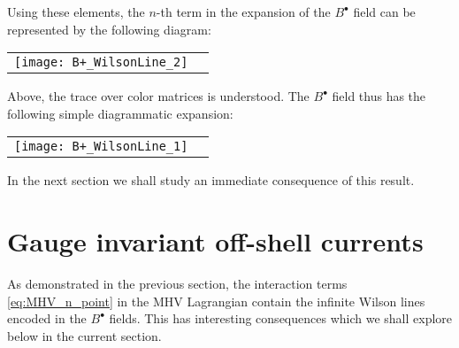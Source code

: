 \documentclass[english,american]{article}
\newcommand\myref{\refstepcounter{equation}\theequation}
\newcommand{\refmyref}[1]{\newcounter{#1}\setcounter{#1}{\theequation}}
\begin{document}
\noindent Using these elements, the $n$-th term in the expansion of the $B^{\bullet}$
field can be represented by the following diagram:

\begin{flushleft}
\begin{tabular}{>{\centering}m{}>{\centering}m{}}
\bigskip{}


\raggedright{}\centerline{\texttt{[image: B+\_WilsonLine\_2]}} & \centering{}\centering{(\myref )}
\refmyref{WL_diag_2}\tabularnewline
\end{tabular}
\par\end{flushleft}

\noindent Above, the trace over color matrices is understood. The
$B^{\bullet}$ field thus has the following simple diagrammatic expansion:

\begin{flushleft}
\begin{tabular}{>{\centering}m{}>{\centering}m{}}
\bigskip{}


\raggedright{}\centerline{\texttt{[image: B+\_WilsonLine\_1]}} & \centering{}\centering{(\myref )}
\refmyref{WL_diag_3}\tabularnewline
\end{tabular}
\par\end{flushleft}

In the next section we shall study an immediate consequence of this
result.

\section{Gauge invariant off-shell currents}

\label{sec:GaugeInvAmps}

As demonstrated in the previous section, the interaction terms \eqref{eq:MHV_n_point} in the MHV Lagrangian contain the infinite Wilson lines encoded in the $B^{\bullet}$ fields. This has interesting consequences which we shall explore below in the current section.
\end{document}
